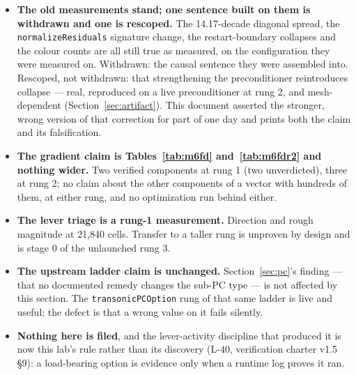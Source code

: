 \documentclass[11pt,a4paper]{article}
\begin{document}
\begin{itemize}
Gate A is rung 1's converged configuration on one host, cold-started: bit-identical iteration
counts and cold signature, which is strong evidence \emph{on that configuration} that the
override is not load-bearing, and not a proof that no DAFoam configuration anywhere depends on
the ordering. An upstream reviewer would want the same check on an incompressible case and on a
Richardson-wrapped one; neither has been run. The effective-value echo the revised recommendation
adds is drafted and \emph{not} implemented, and fixes (b) and (c) remain untested.
\item \textbf{The old measurements stand; one sentence built on them is withdrawn and one is
rescoped.} The 14.17-decade diagonal spread, the \texttt{normalizeResiduals} signature change,
the restart-boundary collapses and the colour counts are all still true as measured, on the
configuration they were measured on. Withdrawn: the causal sentence they were assembled into.
Rescoped, not withdrawn: that strengthening the preconditioner reintroduces collapse --- real,
reproduced on a live preconditioner at rung 2, and mesh-dependent
(Section~\ref{sec:artifact}). This document asserted the stronger, wrong version of that
correction for part of one day and prints both the claim and its falsification.
\item \textbf{The gradient claim is Tables~\ref{tab:m6fd} and~\ref{tab:m6fdr2} and nothing
wider.} Two verified components at rung 1 (two unverdicted), three at rung 2; no claim about
the other components of a vector with hundreds of them, at either rung, and no optimization run
behind either.
\item \textbf{The lever triage is a rung-1 measurement.} Direction and rough magnitude at
21{,}840 cells. Transfer to a taller rung is unproven by design and is stage 0 of the
unlaunched rung 3.
\item \textbf{The upstream ladder claim is unchanged.} Section~\ref{sec:pc}'s finding --- that
no documented remedy changes the sub-PC type --- is not affected by this section. The
\texttt{transonicPCOption} rung of that same ladder is live and useful; the defect is that a
wrong value on it fails silently.
\item \textbf{Nothing here is filed}, and the lever-activity discipline that produced it is now
this lab's rule rather than its discovery (L-40, verification charter v1.5 \S9): a load-bearing
option is evidence only when a runtime log proves it ran.
\end{itemize}
\end{document}
